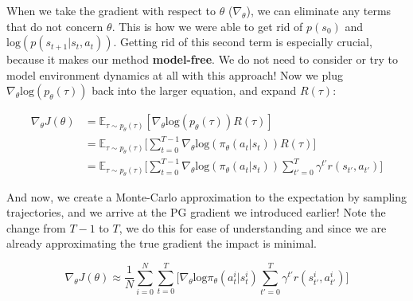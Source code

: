     When we take the gradient with respect to $\theta$ ($\nabla_\theta$), we can eliminate any terms that do not concern $\theta$. This is how we were able to get rid of $p(s_0)$ and $\mathrm{log}(p(s_{t+1}|s_t,a_t))$. Getting rid of this second term is especially crucial, because it makes our method \textbf{model-free}. We do not need to consider or try to model environment dynamics at all with this approach! Now we plug $\nabla_\theta \mathrm{log}(p_\theta(\tau))$ back into the larger equation, and expand $R(\tau)$:

    \begin{align*}
        \nabla_\theta J(\theta) &= \mathbb{E}_{\tau \sim p_\theta(\tau)}[\nabla_\theta \mathrm{log}(p_\theta(\tau)) R(\tau)] \\
        &= \mathbb{E}_{\tau \sim p_\theta(\tau)}\biggl[\sum_{t=0}^{T-1} \nabla_\theta\mathrm{log}(\pi_\theta(a_t|s_t))R(\tau)\biggr]\\
        &= \mathbb{E}_{\tau \sim p_\theta(\tau)}\biggl[\sum_{t=0}^{T-1} \nabla_\theta\mathrm{log}(\pi_\theta(a_t|s_t))\sum_{t'=0}^T \gamma^{t'} r(s_{t'}, a_{t'})\biggr]
    \end{align*}

    And now, we create a Monte-Carlo approximation to the expectation by sampling trajectories, and we arrive at the PG gradient we introduced earlier! Note the change from $T-1$ to $T$, we do this for ease of understanding and since we are already approximating the true gradient the impact is minimal.

    $$\nabla_\theta J(\theta) \approx \frac{1}{N}\sum_{i=0}^N\sum_{t=0}^T\biggl[ \nabla_\theta \mathrm{log}\pi_\theta(a_t^i|s_t^i)\sum_{t'=0}^T \gamma^{t'} r(s_{t'}^i, a_{t'}^i)\biggr]$$


